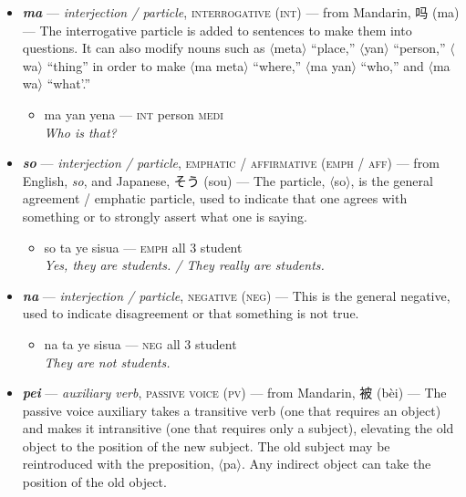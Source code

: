 \documentclass[a4paper]{article}
\begin{document}
\begin{itemize}
	\begin{itemize}
		\item man tampien ale a yena meta a ke ni ale — \textsc{1sg} also go \textsc{loc medi} place \textsc{loc rel 2sg} go \\\textit{I have also been to that place you went to.}
		\item man le kome hafe yena naife pa ke ni kata keike — \textsc{1sg pst} come have \textsc{medi} knife \textsc{instr rel 2sg} cut cake \\\textit{I brought the knife with which you cut the cake.}
	\end{itemize}
	\item \textbf{\textit{ma}} —  \textit{interjection / particle}, \textsc{interrogative (int)} — from Mandarin, 吗 (ma) — The interrogative particle is added to sentences to make them into questions. It can also modify nouns such as $\langle$meta$\rangle$ ``place,'' $\langle$yan$\rangle$ ``person,'' $\langle$wa$\rangle$ ``thing'' in order to make $\langle$ma meta$\rangle$ ``where,'' $\langle$ma yan$\rangle$ ``who,'' and $\langle$ma wa$\rangle$ ``what'.''
	\begin{itemize}
		\item ma yan yena — \textsc{int} person \textsc{medi} \\\textit{Who is that?}
	\end{itemize}
	\item \textbf{\textit{so}} — \textit{interjection / particle}, \textsc{emphatic / affirmative (emph / aff)} — from English, \textit{so}, and Japanese, そう (sou) — The particle, $\langle$so$\rangle$, is the general agreement / emphatic particle, used to indicate that one agrees with something or to strongly assert what one is saying.
	\begin{itemize}
		\item so ta ye sisua — \textsc{emph} all 3 student \\\textit{Yes, they are students. / They really are students.}
	\end{itemize}
	\item \textbf{\textit{na}} — \textit{interjection / particle}, \textsc{negative (neg)} — This is the general negative, used to indicate disagreement or that something is not true.
	\begin{itemize}
		\item na ta ye sisua — \textsc{neg} all 3 student \\\textit{They are not students.}
	\end{itemize}
	\item \textbf{\textit{pei}} — \textit{auxiliary verb}, \textsc{passive voice (pv)}  — from Mandarin, 被 (bèi) — The passive voice auxiliary takes a transitive verb (one that requires an object) and makes it intransitive (one that requires only a subject), elevating the old object to the position of the new subject. The old subject may be reintroduced with the preposition, $\langle$pa$\rangle$. Any indirect object can take the position of the old object.

\end{itemize}
\end{document}
